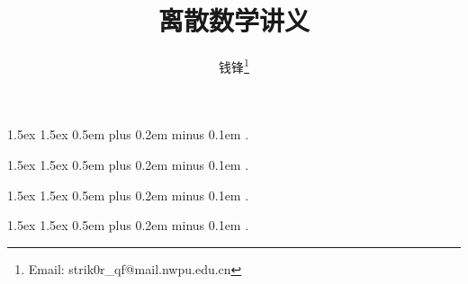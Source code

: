 \documentclass[10pt,UTF8]{ctexbook} %
\title{\textbf{离散数学}讲义}
\author{钱锋\thanks{Email: strik0r\_qf@mail.nwpu.edu.cn}}
\begin{document}
    {1.5ex}                                         %
    {1.5ex}                                         %
    {}                                              %
    {}                                              %
    {\bfseries}                                     %
    {}                                              %
    {0.5em plus 0.2em minus 0.1em}                  %
    {.}

\theoremstyle{mytheoremstyle} \newtheorem{definition}{定义}[section]
\theoremstyle{mytheoremstyle} \newtheorem{example}{习题}[section]
\theoremstyle{mytheoremstyle} \newtheorem{exercise}{}[]

    {1.5ex}                                         %
    {1.5ex}                                         %
    {\kaishu}                                              %
    {}                                              %
    {\bfseries}                                     %
    {}                                              %
    {0.5em plus 0.2em minus 0.1em}                  %
    {.}

\theoremstyle{my2theoremstyle}
\newtheorem{thm}{定理}[section]
\newtheorem{law}{定律}[section]
\newtheorem{educt}{推论}
\newtheorem{prop}{命题}
\newtheorem{lemma}{引理}
\newtheorem{axiom}{公理}
\newtheorem{property}{性质}

    {1.5ex}                                         %
    {1.5ex}                                         %
    {}                                              %
    {}                                              %
    {\bfseries}                                     %
    {}                                              %
    {0.5em plus 0.2em minus 0.1em}                  %
    {.}

\theoremstyle{my4theoremstyle} \newtheorem*{sol}{解}

    {1.5ex}                                         %
    {1.5ex}                                         %
    {}                                              %
    {}                                              %
    {\kaishu}                                       %
    {}                                              %
    {0.5em plus 0.2em minus 0.1em}                  %
    {.}
\end{document}
